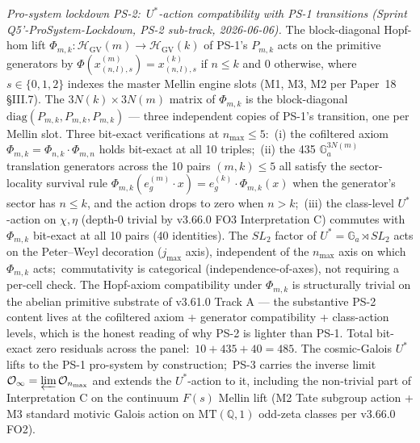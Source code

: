 \documentclass[11pt,a4paper]{article}
\theoremstyle{plain}
\theoremstyle{definition}
\begin{document}
\emph{Pro-system lockdown PS-2:\ $U^*$-action compatibility with
PS-1 transitions (Sprint Q5'-ProSystem-Lockdown, PS-2 sub-track,
2026-06-06).}
The block-diagonal Hopf-hom lift $\Phi_{m, k}: \mathcal{H}_{\mathrm{GV}}(m)
\to \mathcal{H}_{\mathrm{GV}}(k)$ of PS-1's $P_{m, k}$ acts on the
primitive generators by $\Phi(x_{(n, l), s}^{(m)}) = x_{(n, l), s}^{(k)}$
if $n \le k$ and $0$ otherwise, where $s \in \{0, 1, 2\}$ indexes
the master Mellin engine slots (M1, M3, M2 per Paper~18 \S III.7).
The $3 N(k) \times 3 N(m)$ matrix of $\Phi_{m, k}$ is the
block-diagonal $\mathrm{diag}(P_{m, k}, P_{m, k}, P_{m, k})$ — three
independent copies of PS-1's transition, one per Mellin slot. Three
bit-exact verifications at $n_{\max} \le 5$:\ (i) the cofiltered
axiom $\Phi_{m, k} = \Phi_{n, k} \cdot \Phi_{m, n}$ holds bit-exact
at all 10 triples;\ (ii) the 435 $\mathbb{G}_a^{3 N(m)}$ translation
generators across the 10 pairs $(m, k) \le 5$ all satisfy the
sector-locality survival rule
$\Phi_{m, k}(e_g^{(m)} \cdot x) = e_g^{(k)} \cdot \Phi_{m, k}(x)$
when the generator's sector has $n \le k$, and the action drops
to zero when $n > k$;\ (iii) the class-level $U^*$-action on
$\chi, \eta$ (depth-0 trivial by v3.66.0 FO3 Interpretation C)
commutes with $\Phi_{m, k}$ bit-exact at all 10 pairs (40
identities). The $SL_2$ factor of $U^* = \mathbb{G}_a \rtimes SL_2$
acts on the Peter--Weyl decoration ($j_{\max}$ axis), independent
of the $n_{\max}$ axis on which $\Phi_{m, k}$ acts;\ commutativity
is categorical (independence-of-axes), not requiring a per-cell
check. The Hopf-axiom compatibility under $\Phi_{m, k}$ is
structurally trivial on the abelian primitive substrate of v3.61.0
Track A — the substantive PS-2 content lives at the cofiltered
axiom + generator compatibility + class-action levels, which is the
honest reading of why PS-2 is lighter than PS-1. Total bit-exact
zero residuals across the panel:\ $10 + 435 + 40 = 485$. The
cosmic-Galois $U^*$ lifts to the PS-1 pro-system by construction;\
PS-3 carries the inverse limit
$\mathcal{O}_\infty = \varprojlim \mathcal{O}_{n_{\max}}$ and extends
the $U^*$-action to it, including the non-trivial part of
Interpretation C on the continuum $F(s)$ Mellin lift (M2 Tate
subgroup action + M3 standard motivic Galois action on
$\mathrm{MT}(\mathbb{Q}, 1)$ odd-zeta classes per v3.66.0 FO2).
\end{document}
